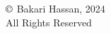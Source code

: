 \restoregeometry

\cleardoublepage

\frontmatter

\thispagestyle{empty}

{%
\begin{vplace}[1]
	\centering
	$\copyright$ Bakari Hassan, 2024\\
	All Rights Reserved
\end{vplace}
}%

\cleardoublepage







\cleardoublepage




\clearpage

\cleardoublepage

\tableofcontents*

\clearpage

\listoffigures

\clearpage

\listoftables

\cleardoublepage

\mainmatter

